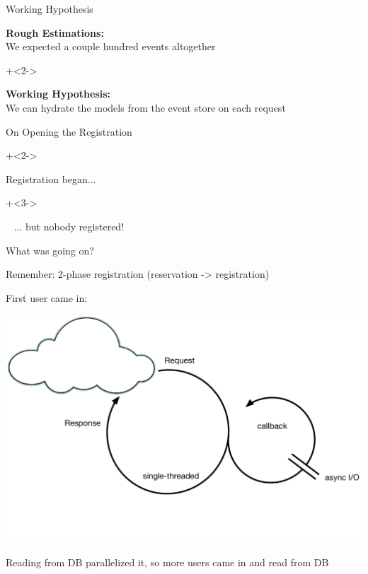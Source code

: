 \begin{frame}[fragile]{Working Hypothesis}

\textbf{Rough Estimations:} \\[.7em]
We expected a couple hundred events altogether

\onslide+<2->
\vspace{5em}

\textbf{Working Hypothesis:} \\[.7em]
We can hydrate the models from the event store on each request

\end{frame}


\begin{frame}[fragile]{On Opening the Registration}

\onslide+<2->

Registration began...

\onslide+<3->

\vspace{3em}

~ \hspace{10em} ... but nobody registered!
 
\end{frame}

\begin{frame}[fragile]{What was going on?}

Remember: 2-phase registration (reservation -> registration)

First user came in:

\includegraphics[width=.4\textwidth]{../Nodejs3.pdf}

Reading from DB parallelized it, so more users came in and read from DB

\end{frame}

